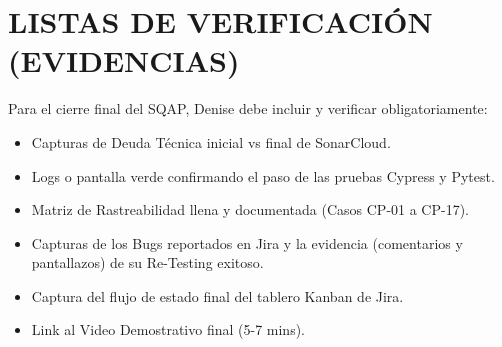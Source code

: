 \documentclass[12pt,a4paper]{article}
\begin{document}
\section{LISTAS DE VERIFICACIÓN (EVIDENCIAS)}
Para el cierre final del SQAP, Denise debe incluir y verificar obligatoriamente:
\begin{itemize}
    \item Capturas de Deuda Técnica inicial vs final de SonarCloud.
    \item Logs o pantalla verde confirmando el paso de las pruebas Cypress y Pytest.
    \item Matriz de Rastreabilidad llena y documentada (Casos CP-01 a CP-17).
    \item Capturas de los Bugs reportados en Jira y la evidencia (comentarios y pantallazos) de su Re-Testing exitoso.
    \item Captura del flujo de estado final del tablero Kanban de Jira.
    \item Link al Video Demostrativo final (5-7 mins).
\end{itemize}
\end{document}
